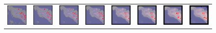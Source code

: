 \documentclass{itatnew}
\begin{document}
\begin{figure}[htp]
\begin{tabular}{cccccccc}
    \includegraphics[width=4.6em]{images/gen-demo-blur-gstar-1}&
    \includegraphics[width=4.6em]{images/gen-demo-blur-gstar-2}&
    \includegraphics[width=4.6em]{images/gen-demo-blur-gstar-3}&
    \includegraphics[width=4.6em]{images/gen-demo-blur-gstar-4}&
    \includegraphics[width=4.6em]{images/gen-demo-blur-gstar-5}&
    \includegraphics[width=4.6em]{images/gen-demo-blur-gstar-6}&
    \includegraphics[width=4.6em]{images/gen-demo-blur-gstar-7}&
    \includegraphics[width=4.6em]{images/gen-demo-blur-gstar-8}\\
  \end{tabular}


\end{figure}
\end{document}
